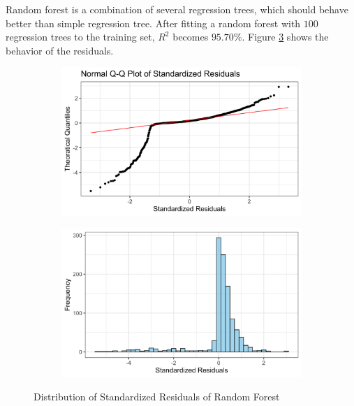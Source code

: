 \documentclass{article}
\begin{document}
Random forest is a combination of several regression trees, which should behave better than simple regression tree. After fitting a random forest with $100$ regression trees to the training set, $R^2$ becomes $95.70\%$. Figure \ref{fig:dis_res_forest} shows the behavior of the residuals.
\begin{figure}[!ht]
	\centering
	
	\begin{subfigure}{0.45\textwidth}
		\centering
		\includegraphics[width=\linewidth]{images/qq_forest.png}
		\label{fig:qq_forest}
	\end{subfigure}
	\hspace{0.05\textwidth} %
	\begin{subfigure}{0.45\textwidth}
		\centering
		\includegraphics[width=\linewidth]{images/his_forest.png}
		\label{fig:his_forest}
	\end{subfigure}
	
	\caption{Distribution of Standardized Residuals of Random Forest}
	\label{fig:dis_res_forest}
\end{figure}
\end{document}
